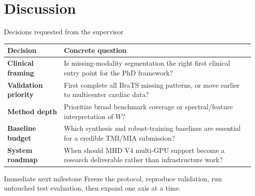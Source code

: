 \documentclass[aspectratio=169,11pt]{beamer}
\begin{document}
\section{Discussion}

\begin{frame}{Decisions requested from the supervisor}
  \footnotesize
  \renewcommand{\arraystretch}{0.9}
  \begin{tabularx}{\textwidth}{>{\bfseries\color{LookNavy}}p{2.7cm} Y}
    \toprule
    Decision & Concrete question \\
    \midrule
    Clinical framing & Is missing-modality segmentation the right first clinical entry point for the PhD framework? \\
    Validation priority & First complete all BraTS missing patterns, or move earlier to multicenter cardiac data? \\
    Method depth & Prioritize broad benchmark coverage or spectral/feature interpretation of $W$? \\
    Baseline budget & Which synthesis and robust-training baselines are essential for a credible TMI/MIA submission? \\
    System roadmap & When should MHD V4 multi-GPU support become a research deliverable rather than infrastructure work? \\
    \bottomrule
  \end{tabularx}
  \vspace{1.5mm}
  \begin{exampleblock}{Immediate next milestone}
    Freeze the protocol, reproduce validation, run untouched test evaluation, then expand one axis at a time.
  \end{exampleblock}
\end{frame}

\begin{frame}[plain]
\end{frame}
\end{document}
